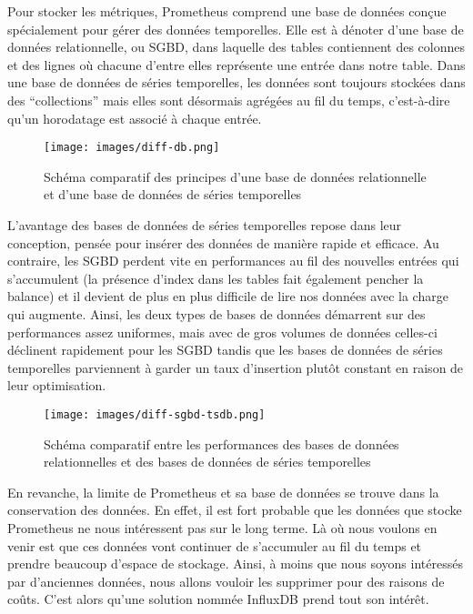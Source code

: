 \documentclass[oneside,12pt]{report}
\begin{document}
Pour stocker les métriques, Prometheus comprend une base de données conçue spécialement pour gérer des données temporelles. Elle est à dénoter d'une base de données relationnelle, ou SGBD, dans laquelle des tables contiennent des colonnes et des lignes où chacune d'entre elles représente une entrée dans notre table. Dans une base de données de séries temporelles, les données sont toujours stockées dans des “collections” mais elles sont désormais agrégées au fil du temps, c'est-à-dire qu'un horodatage est associé à chaque entrée.

\begin{figure}[H]
    \centering
    \texttt{[image: images/diff-db.png]}
    \caption{Schéma comparatif des principes d'une base de données relationnelle et d'une base de données de séries temporelles}
    \label{fig:mesh1}
\end{figure}

L'avantage des bases de données de séries temporelles repose dans leur conception, pensée pour insérer des données de manière rapide et efficace. Au contraire, les SGBD perdent vite en performances au fil des nouvelles entrées qui s'accumulent (la présence d'index dans les tables fait également pencher la balance) et il devient de plus en plus difficile de lire nos données avec la charge qui augmente. Ainsi, les deux types de bases de données démarrent sur des performances assez uniformes, mais avec de gros volumes de données celles-ci déclinent rapidement pour les SGBD tandis que les bases de données de séries temporelles parviennent à garder un taux d'insertion plutôt constant en raison de leur optimisation.

\begin{figure}[H]
    \centering
    \texttt{[image: images/diff-sgbd-tsdb.png]}
    \caption{Schéma comparatif entre les performances des bases de données relationnelles et des bases de données de séries temporelles}
    \label{fig:mesh1}
\end{figure}

En revanche, la limite de Prometheus et sa base de données se trouve dans la conservation des données. En effet, il est fort probable que les données que stocke Prometheus ne nous intéressent pas sur le long terme. Là où nous voulons en venir est que ces données vont continuer de s'accumuler au fil du temps et prendre beaucoup d'espace de stockage. Ainsi, à moins que nous soyons intéressés par d'anciennes données, nous allons vouloir les supprimer pour des raisons de coûts. C'est alors qu'une solution nommée InfluxDB prend tout son intérêt.
\end{document}
